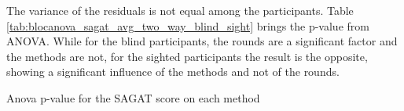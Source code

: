 The variance of the residuals is not equal among the participants. Table \ref{tab:blocanova_sagat_avg_two_way_blind_sight} brings the p-value from ANOVA. While for the blind participants, the rounds are a significant factor and the methods are not, for the sighted participants the result is the opposite, showing a significant influence of the methods and not of the rounds.

\begin{table}[!htb]
    \caption{Anova p-value for the SAGAT score on each method}
    \label{tab:blocanova_sagat_avg_two_way_blind_sight}
\begin{minipage}{0.45\linewidth}
    
\end{minipage}%
\begin{minipage}{0.05\linewidth}
    \hfill
\end{minipage}%
\begin{minipage}{0.45\linewidth}
        
\end{minipage}
\end{table}


%
%

